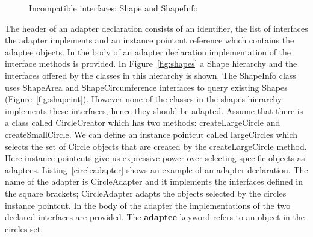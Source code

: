 \documentclass{llncs}
\begin{document}
\vspace{-5pt}
\begin{figure}[h]
\hspace{10pt}
\caption{Incompatible interfaces: Shape and ShapeInfo}
\label{fig:shapeinfo}
\end{figure}

The header of an adapter declaration consists of an identifier, the list of interfaces the adapter implements and an instance pointcut reference which contains the adaptee objects. In the body of an adapter declaration implementation of the interface methods is provided. In Figure~\ref{fig:shapes} a \textsf{Shape} hierarchy and the interfaces offered by the classes in this hierarchy is shown. The \textsf{ShapeInfo} class uses \textsf{ShapeArea} and \textsf{ShapeCircumference} interfaces to query existing \textsf{Shape}s (Figure~\ref{fig:shapeint}). However none of the classes in the shapes hierarchy implements these interfaces, hence they should be adapted. Assume that there is a class called \textsf{CircleCreator} which has two methods: \textsf{createLargeCircle} and \textsf{createSmallCircle}. We can define an instance pointcut called \textsf{largeCircles} which selects the set of \textsf{Circle} objects that are created by the \textsf{createLargeCircle} method. Here instance pointcuts give us expressive power over selecting specific objects as adaptees. Listing~\ref{circleadapter} shows an example of an adapter declaration. The name of the adapter is \textsf{CircleAdapter} and it implements the interfaces defined in the square brackets; \textsf{CircleAdapter} adapts the objects selected by the \textsf{circles} instance pointcut. In the body of the adapter the implementations of the two declared interfaces are provided. The \textsf{\textbf{adaptee}} keyword refers to an object in the \textsf{circles} set. 
\end{document}
